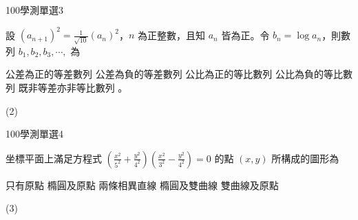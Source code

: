     \begin{QUESTION}
        \begin{ExamInfo}{100}{學測}{單選}{3}
        \end{ExamInfo}
        \begin{ExamAnsRateInfo}{28}{56}{14}{14}
        \end{ExamAnsRateInfo}
        \begin{QBODY}
            設 $(a_{n+1})^2=\frac{1}{\sqrt{10}}(a_n)^2$，$n$ 為正整數，且知 $a_n $ 皆為正。令 $b_n=\log a_n$，則數列 $b_1, b_2,b_3,\cdots,$ 為 
			\begin{QOPS} 
				\QOP 公差為正的等差數列 
				\QOP 公差為負的等差數列 
				\QOP 公比為正的等比數列 
				\QOP 公比為負的等比數列 
				\QOP 既非等差亦非等比數列 。
			\end{QOPS}
        \end{QBODY}
        \begin{QFROMS}
        \end{QFROMS}
        \begin{QTAGS}\end{QTAGS}
        \begin{QANS}
            (2)
        \end{QANS}
        \begin{QSOLLIST}
        \end{QSOLLIST}
        \begin{QEMPTYSPACE}
        \end{QEMPTYSPACE}
    \end{QUESTION}
    \begin{QUESTION}
        \begin{ExamInfo}{100}{學測}{單選}{4}
        \end{ExamInfo}
        \begin{ExamAnsRateInfo}{30}{51}{20}{19}
        \end{ExamAnsRateInfo}
        \begin{QBODY}
            坐標平面上滿足方程式 $(\frac{x^2}{5^2} + \frac{y^2}{4^2})(\frac{x^2}{3^2} - \frac{y^2}{4^2})=0$ 的點 $(x,y)$ 所構成的圖形為 \quad 
			\begin{QOPS} 
                \QOP 只有原點 
				\QOP 橢圓及原點 
				\QOP 兩條相異直線 
				\QOP 橢圓及雙曲線 
				\QOP 雙曲線及原點
			\end{QOPS}
        \end{QBODY}
        \begin{QFROMS}
        \end{QFROMS}
        \begin{QTAGS}\end{QTAGS}
        \begin{QANS}
            (3)
        \end{QANS}
        \begin{QSOLLIST}
        \end{QSOLLIST}
        \begin{QEMPTYSPACE}
        \end{QEMPTYSPACE}
    \end{QUESTION}
